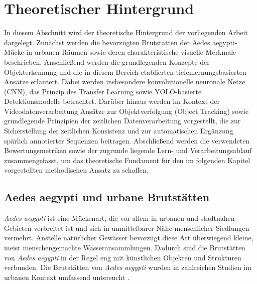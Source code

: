 \newpage
\section{Theoretischer Hintergrund}
In diesem Abschnitt wird der theoretische Hintergrund der vorliegenden Arbeit dargelegt.
Zunächst werden die bevorzugten Brutstätten der Aedes aegypti-Mücke in urbanen Räumen
sowie deren charakteristische visuelle Merkmale beschrieben. Anschließend werden die
grundlegenden Konzepte der Objekterkennung und die in diesem Bereich etablierten
tiefenlernungsbasierten Ansätze erläutert. Dabei werden insbesondere konvolutionelle
neuronale Netze (CNN), das Prinzip des Transfer Learning sowie YOLO-basierte
Detektionsmodelle betrachtet. Darüber hinaus werden im Kontext der
Videodatenverarbeitung Ansätze zur Objektverfolgung (Object Tracking) sowie grundlegende
Prinzipien der zeitlichen Datenverarbeitung vorgestellt, die zur Sicherstellung der
zeitlichen Konsistenz und zur automatischen Ergänzung spärlich annotierter Sequenzen
beitragen. Abschließend werden die verwendeten Bewertungsmetriken sowie der zugrunde
liegende Lern- und Verarbeitungsablauf zusammengefasst, um das theoretische Fundament
für den im folgenden Kapitel vorgestellten methodischen Ansatz zu schaffen.

\subsection{Aedes aegypti und urbane Brutstätten}

\textit{Aedes aegypti} ist eine Mückenart, die vor allem in urbanen und stadtnahen Gebieten verbreitet ist und sich in unmittelbarer Nähe menschlicher Siedlungen vermehrt. Anstelle natürlicher Gewässer bevorzugt diese Art überwiegend kleine, meist menschengemachte Wasseransammlungen. Dadurch sind die Brutstätten von \textit{Aedes aegypti} in der Regel eng mit künstlichen Objekten und Strukturen verbunden. Die Brutstätten von \textit{Aedes aegypti} wurden in zahlreichen Studien im urbanen Kontext umfassend untersucht \cite{Vezzani2002,Paploski2016,Cavalcanti2016,Valenca2013}.

